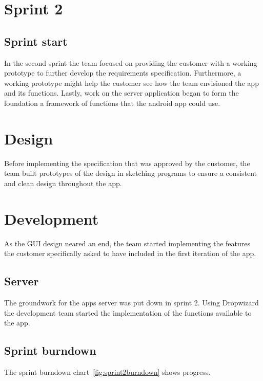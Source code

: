 \section{Sprint 2}

\subsection{Sprint start}
In the second sprint the team focused on providing the customer with a working
prototype to further develop the requirements specification. Furthermore, a
working prototype might help the customer see how the team envisioned the app
and its functions. Lastly, work on the server application began to form the
foundation a framework of functions that the android app could use.

\section{Design}
Before implementing the specification that was approved by the customer, the
team built prototypes of the design in sketching programs to ensure a consistent
and clean design throughout the app. 

\section{Development}
As the GUI design neared an end, the team started implementing the features the
customer specifically asked to have included in the first iteration of the app.

\subsection{Server}
The groundwork for the apps server was put down in sprint 2. Using Dropwizard
the development team started the implementation of the functions available to
the app.

\subsection{Sprint burndown}

The sprint burndown chart~\ref{fig:sprint2burndown} shows progress.

